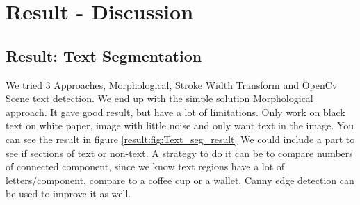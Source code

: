 \documentclass[Report.tex]{subfiles}
\begin{document}
\chapter{Result - Discussion}
\label{chap:Result - Discussion}
\section{Result: Text Segmentation}
We tried 3 Approaches, Morphological, Stroke Width Transform and OpenCv Scene text detection. We end up with the simple solution Morphological approach. It gave good result, but have a lot of limitations. Only work on black text on white paper, image with little noise and only want text in the image. You can see the result in figure \ref{result:fig:Text_seg_result} We could include a part to see if sections of text or non-text. A strategy to do it can be to compare  numbers of connected component, since we know text regions have a lot of letters/component, compare to a coffee cup or a wallet. Canny edge detection can be used to improve it as well.
\end{document}
